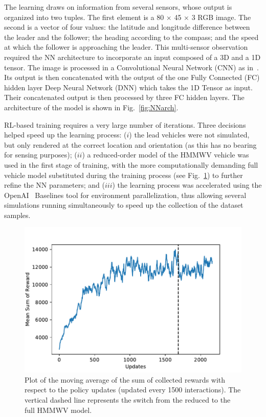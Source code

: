 \documentclass[12pt,twocolumn]{article}
\begin{document}
The learning draws on information from several sensors, whose output is organized into two tuples. The first element is a 80 $\times$ 45 $\times$ 3 RGB image. The second is a vector of four values: the latitude and longitude difference between the leader and the follower; the heading according to the compass; and the speed at which the follower is approaching the leader. This multi-sensor observation required the NN architecture to incorporate an input composed of a 3D and a 1D tensor. The image is processed in a Convolutional Neural Network (CNN) as in~\cite{Mnih13}. Its output is then concatenated with the output of the one Fully Connected (FC) hidden layer Deep Neural Network (DNN) which takes the 1D Tensor as input. Their concatenated output is then processed by three FC hidden layers. The architecture of the model is shown in Fig.~\ref{fig:NNarch}.

RL-based training requires a very large number of iterations. Three decisions helped speed up the learning process: ($i$) the lead vehicles were not simulated, but only rendered at the correct location and orientation (as this has no bearing for sensing purposes); ($ii$) a reduced-order model of the HMMWV vehicle was used in the first stage of training, with the more computationally demanding full vehicle model substituted during the training process (see Fig.~\ref{fig:Rewards}) to further refine the NN parameters; and ($iii$) the learning process was accelerated using the OpenAI~\cite{Brockman16Gym} Baselines tool for environment parallelization, thus allowing several simulations running simultaneously to speed up the collection of the dataset samples.


\begin{figure}
	\centering
	\includegraphics[width=\columnwidth]{Figs/rewards.pdf}
	\caption{Plot of the moving average of the sum of collected rewards with respect to the policy updates (updated every 1500 interactions). The vertical dashed line represents the switch from the reduced to the full HMMWV model.}
	\label{fig:Rewards}
\end{figure}
\end{document}
